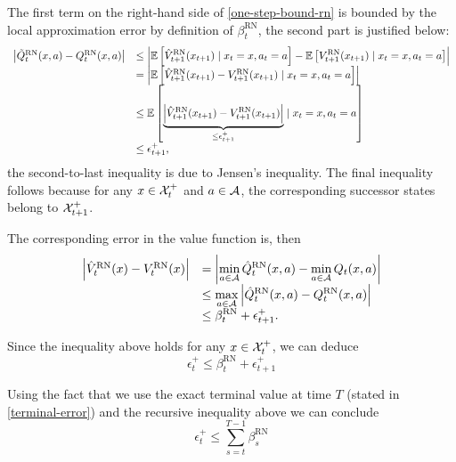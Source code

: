 The first term on the right-hand side of \eqref{one-step-bound-rn} is bounded by the local approximation error by definition of $\beta_t^{\text{RN}}$, the second part is justified below:
\begin{equation}
	\begin{array}{rl}
		\left| \tilde{Q}_t^{\text{RN}}(x, a) - Q_t^{\text{RN}}(x, a) \right| & \displaystyle \leq \left| \mathbb{E} \left[ \hat{V}_{t+1}^{\text{RN}}(x_{t+1}) \mid x_t = x, a_t = a \right] - \mathbb{E} \left[ V_{t+1}^{\text{RN}}(x_{t+1}) \mid x_t = x, a_t = a \right] \right| \\
		& = \left| \mathbb{E} \left[ \hat{V}_{t+1}^{\text{RN}}(x_{t+1}) - V_{t+1}^{\text{RN}}(x_{t+1}) \mid x_t = x, a_t = a \right] \right| \\
		& \displaystyle \leq \mathbb{E} \left[ \underbrace{\left| \hat{V}_{t+1}^{\text{RN}}(x_{t+1}) - V_{t+1}^{\text{RN}}(x_{t+1}) \right|}_{ \leq \epsilon_{t+1}^+} \mid x_t = x, a_t = a \right] \\
		& \leq \epsilon_{t+1}^+,
	\end{array}
	\notag
	\label{rn-continuation-q-error}
\end{equation}
the second-to-last inequality is due to Jensen's inequality. The final inequality follows because for any $x \in \mathcal{X}_t^+$ and $a \in \mathcal{A}$, the corresponding successor states belong to
$\mathcal{X}_{t+1}^+$.

The corresponding error in the value function is, then
\begin{equation}
	\begin{array}{rl}
		\left| \hat{V}_t^{\text{RN}}(x) - V_t^{\text{RN}}(x) \right| & \displaystyle = \left| \min_{a \in \mathcal{A}} \hat{Q}_t^{\text{RN}}(x, a) - \min_{a \in \mathcal{A}} Q_t(x, a) \right| \\
		& \displaystyle \leq  \max_{a \in \mathcal{A}} \left| \hat{Q}_t^{\text{RN}}(x, a) - Q_t^{\text{RN}}(x, a) \right| \\
		& \displaystyle \leq \beta_t^{\text{RN}} + \epsilon_{t+1}^+.
	\end{array}
	\notag
	\label{rn-one-step-value}
\end{equation}

Since the inequality above holds for any $x \in \mathcal{X}_t^+$, we can deduce
\begin{equation*}
	\epsilon_t^+ \leq \beta_t^{\text{RN}} + \epsilon_{t+1}^+
\end{equation*}

Using the fact that we use the exact terminal value at time $T$ (stated in \eqref{terminal-error}) and the recursive inequality above we can conclude
\begin{equation}
	\epsilon_t^+ \leq \sum_{s=t}^{T-1} \beta_s^{\text{RN}}
\end{equation}

